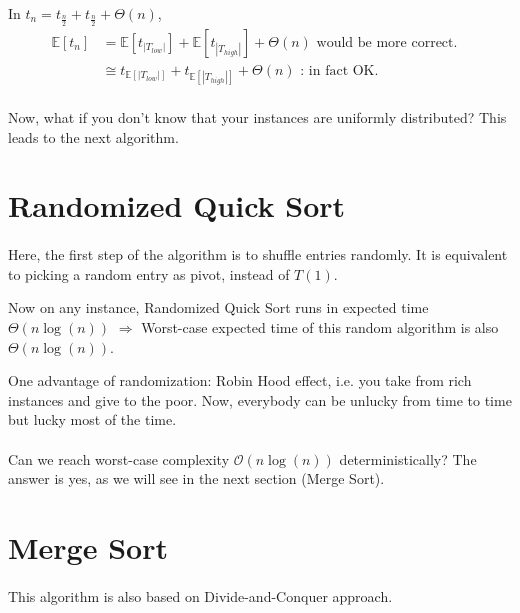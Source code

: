 \begin{remark}
In $t_n = t_{\frac{n}{2}}+ t_{\frac{n}{2}} + \Theta(n)$,
\begin{align*}
\mathbb{E}[t_n] & = \mathbb{E}[t_{|T_{low}|}]+ \mathbb{E}[t_{|T_{high}|}] + \Theta(n) \text{ would be more correct.} & \\
& \cong t_{\mathbb{E}[|T_{low}|]} + t_{\mathbb{E}[|T_{high}|]}  + \Theta(n) \text{ : in fact OK.} & \\
\end{align*}

\end{remark}

Now, what if you don't know that your instances are uniformly distributed? This leads to the next algorithm.

\section{Randomized Quick Sort}
\paragraph{}
Here, the first step of the algorithm is to shuffle entries randomly. It is equivalent to picking a random entry as pivot, instead of $T(1)$.

Now on any instance, Randomized Quick Sort runs in expected time $\Theta(n \log(n))$ $\Rightarrow$ Worst-case expected time of this random algorithm is also $\Theta(n \log(n))$. 

One advantage of randomization: Robin Hood effect, i.e. you take from rich instances and give to the poor. Now, everybody can be unlucky from time to time but lucky most of the time. 

\paragraph{}
Can we reach worst-case complexity $\mathcal{O}(n \log(n))$ deterministically? 
\newline The answer is yes, as we will see in the next section (Merge Sort). 

\section{Merge Sort}

\paragraph{}
This algorithm is also based on Divide-and-Conquer approach. 


